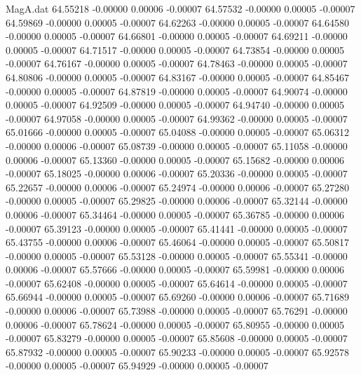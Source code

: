 \begin{filecontents}{MagA.dat}
  64.55218   -0.00000    0.00006   -0.00007
  64.57532   -0.00000    0.00005   -0.00007
  64.59869   -0.00000    0.00005   -0.00007
  64.62263   -0.00000    0.00005   -0.00007
  64.64580   -0.00000    0.00005   -0.00007
  64.66801   -0.00000    0.00005   -0.00007
  64.69211   -0.00000    0.00005   -0.00007
  64.71517   -0.00000    0.00005   -0.00007
  64.73854   -0.00000    0.00005   -0.00007
  64.76167   -0.00000    0.00005   -0.00007
  64.78463   -0.00000    0.00005   -0.00007
  64.80806   -0.00000    0.00005   -0.00007
  64.83167   -0.00000    0.00005   -0.00007
  64.85467   -0.00000    0.00005   -0.00007
  64.87819   -0.00000    0.00005   -0.00007
  64.90074   -0.00000    0.00005   -0.00007
  64.92509   -0.00000    0.00005   -0.00007
  64.94740   -0.00000    0.00005   -0.00007
  64.97058   -0.00000    0.00005   -0.00007
  64.99362   -0.00000    0.00005   -0.00007
  65.01666   -0.00000    0.00005   -0.00007
  65.04088   -0.00000    0.00005   -0.00007
  65.06312   -0.00000    0.00006   -0.00007
  65.08739   -0.00000    0.00005   -0.00007
  65.11058   -0.00000    0.00006   -0.00007
  65.13360   -0.00000    0.00005   -0.00007
  65.15682   -0.00000    0.00006   -0.00007
  65.18025   -0.00000    0.00006   -0.00007
  65.20336   -0.00000    0.00005   -0.00007
  65.22657   -0.00000    0.00006   -0.00007
  65.24974   -0.00000    0.00006   -0.00007
  65.27280   -0.00000    0.00005   -0.00007
  65.29825   -0.00000    0.00006   -0.00007
  65.32144   -0.00000    0.00006   -0.00007
  65.34464   -0.00000    0.00005   -0.00007
  65.36785   -0.00000    0.00006   -0.00007
  65.39123   -0.00000    0.00005   -0.00007
  65.41441   -0.00000    0.00005   -0.00007
  65.43755   -0.00000    0.00006   -0.00007
  65.46064   -0.00000    0.00005   -0.00007
  65.50817   -0.00000    0.00005   -0.00007
  65.53128   -0.00000    0.00005   -0.00007
  65.55341   -0.00000    0.00006   -0.00007
  65.57666   -0.00000    0.00005   -0.00007
  65.59981   -0.00000    0.00006   -0.00007
  65.62408   -0.00000    0.00005   -0.00007
  65.64614   -0.00000    0.00005   -0.00007
  65.66944   -0.00000    0.00005   -0.00007
  65.69260   -0.00000    0.00006   -0.00007
  65.71689   -0.00000    0.00006   -0.00007
  65.73988   -0.00000    0.00005   -0.00007
  65.76291   -0.00000    0.00006   -0.00007
  65.78624   -0.00000    0.00005   -0.00007
  65.80955   -0.00000    0.00005   -0.00007
  65.83279   -0.00000    0.00005   -0.00007
  65.85608   -0.00000    0.00005   -0.00007
  65.87932   -0.00000    0.00005   -0.00007
  65.90233   -0.00000    0.00005   -0.00007
  65.92578   -0.00000    0.00005   -0.00007
  65.94929   -0.00000    0.00005   -0.00007

\end{filecontents}
